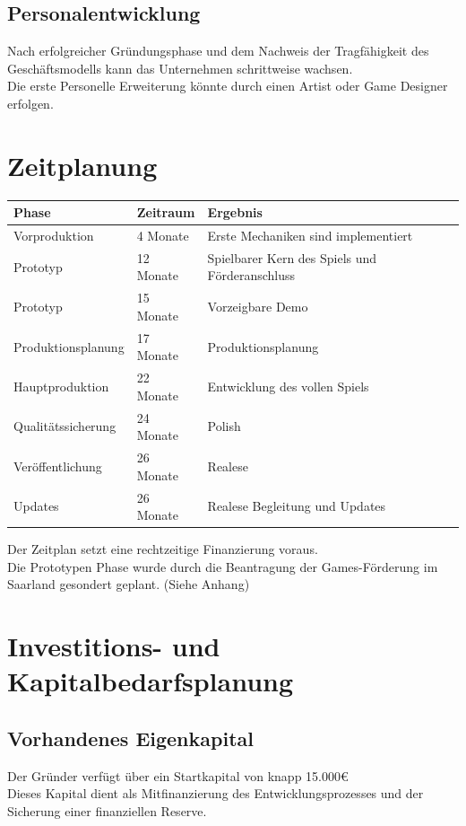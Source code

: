 \documentclass[envcountsame,envcountchap deutsch]{i-studis}
\begin{document}
\section{Personalentwicklung}
Nach erfolgreicher Gründungsphase und dem Nachweis der Tragfähigkeit des Geschäftsmodells kann das Unternehmen schrittweise wachsen.
\\
Die erste Personelle Erweiterung könnte durch einen Artist oder Game Designer erfolgen.

\chapter{Zeitplanung}
\begin{table}[ht]
	\centering
	\begin{tabular}{|p{5cm}|l|p{9cm}|}
		\hline
	 \textbf{Phase}  & \textbf{Zeitraum}& \textbf{Ergebnis} \\ \hline
	 Vorproduktion  & 4 Monate& Erste Mechaniken sind implementiert \\ \hline
	 Prototyp  & 12 Monate& Spielbarer Kern des Spiels und Förderanschluss \\ \hline
	 Prototyp  & 15 Monate& Vorzeigbare Demo \\ \hline
	 Produktionsplanung  & 17 Monate& Produktionsplanung \\ \hline
	 Hauptproduktion  & 22 Monate& Entwicklung des vollen Spiels \\ \hline
	 Qualitätssicherung  & 24 Monate& Polish \\ \hline
	 Veröffentlichung  & 26 Monate& Realese \\ \hline
	 Updates  & 26 Monate& Realese Begleitung und Updates \\ \hline
	\end{tabular}
\end{table}

Der Zeitplan setzt eine rechtzeitige Finanzierung voraus.\\
Die Prototypen Phase wurde durch die Beantragung der Games-Förderung im Saarland gesondert geplant.
(Siehe Anhang)
\chapter{ Investitions- und Kapitalbedarfsplanung}
\section{Vorhandenes Eigenkapital}
Der Gründer verfügt über ein Startkapital von knapp 15.000€ \\
Dieses Kapital dient als Mitfinanzierung des Entwicklungsprozesses und der Sicherung einer finanziellen Reserve.
\end{document}
